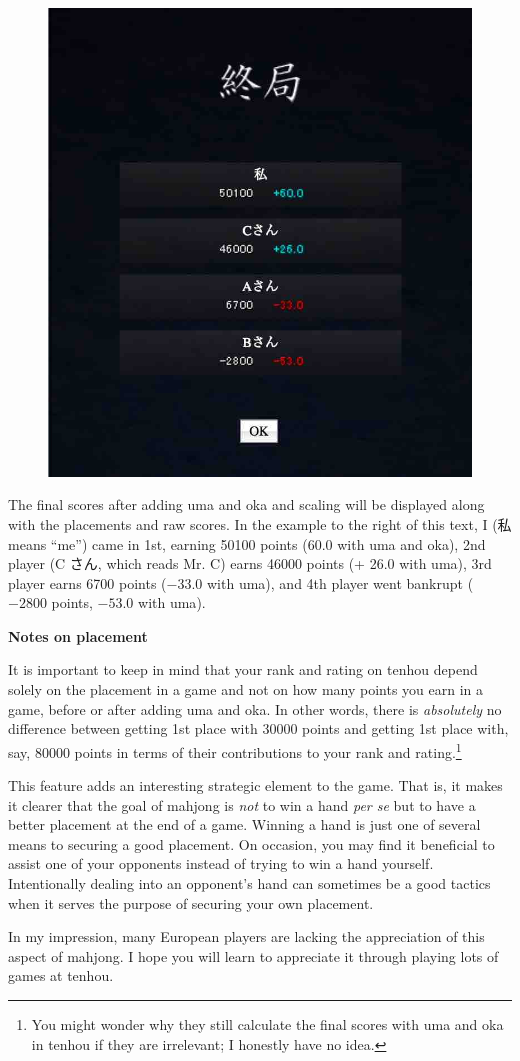 \begin{figure}
\begin{center}
\includegraphics[width=.4\textwidth,clip]{figs/finalscore.jpg}
\end{center}
\vspace{-25pt}
\end{figure}

\bigskip

The final scores after adding {\jap uma} and {\jap oka} and scaling will be displayed along with the placements and raw scores. In the example to the right of this text, I (私 means ``me'') came in 1st, earning 50100 points (60.0 with {\jap uma} and {\jap oka}), 2nd player (C さん, which reads Mr. C) earns 46000 points (+ 26.0 with {\jap uma}), 3rd player earns 6700 points ($-33.0$ with {\jap uma}), and 4th player went bankrupt ($-2800$ points, $-53.0$ with {\jap uma}). 

\newpage
\begin{boxnote} \small
{\bf\normalsize Notes on placement}

\bigskip
It is important to keep in mind that your rank and rating on {\jap tenhou} depend solely on the placement in a game and not on how many points you earn in a game, before or after adding {\jap uma} and {\jap oka}. In other words, there is \emph{absolutely} no difference between getting 1st place with 30000 points and getting 1st place with, say, 80000 points in terms of their contributions to your rank and rating.\footnote{You might wonder why they still calculate the final scores with {\jap uma} and {\jap oka} in {\jap tenhou} if they are irrelevant; I honestly have no idea.}

\bigskip
This feature adds an interesting strategic element to the game. That is, it makes it clearer that the goal of mahjong is \emph{not} to win a hand \emph{per se} but to have a better placement at the end of a game. Winning a hand is just one of several means to securing a good placement. On occasion, you may find it beneficial to assist one of your opponents instead of trying to win a hand yourself. Intentionally dealing into an opponent's hand can sometimes be a good tactics when it serves the purpose of securing your own placement. 

\bigskip
In my impression, many European players are lacking the appreciation of this aspect of mahjong. I hope you will learn to appreciate it through playing lots of games at {\jap tenhou}.
\vspace{5pt}
\end{boxnote}


